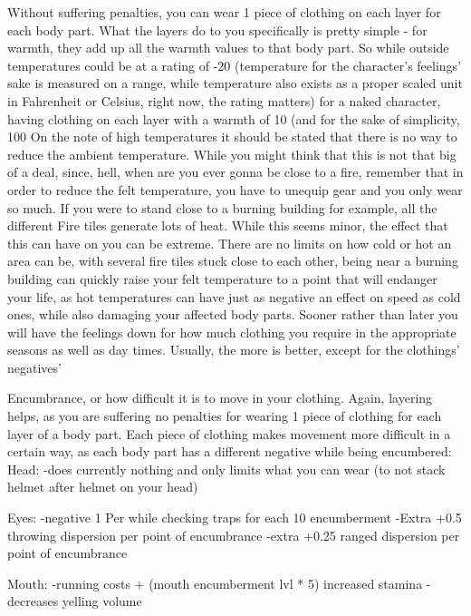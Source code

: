 \documentclass[11pt]{report}
\begin{document}
Without suffering penalties, you can wear 1 piece of clothing on each layer for each body part. What the layers do to you specifically is pretty simple - for warmth, they add up all the warmth values to that body part. So while outside temperatures could be at a rating of -20 (temperature for the character's feelings' sake is measured on a range, while temperature also exists as a proper scaled unit in Fahrenheit or Celsius, right now, the rating matters) for a naked character, having clothing on each layer with a warmth of 10 (and for the sake of simplicity, 100%
On the note of high temperatures it should be stated that there is no way to reduce the ambient temperature. While you might think that this is not that big of a deal, since, hell, when are you ever gonna be close to a fire, remember that in order to reduce the felt temperature, you have to unequip gear and you only wear so much. If you were to stand close to a burning building for example, all the different Fire tiles generate lots of heat. While this seems minor, the effect that this can have on you can be extreme. There are no limits on how cold or hot an area can be, with several fire tiles stuck close to each other, being near a burning building can quickly raise your felt temperature to a point that will endanger your life, as hot temperatures can have just as negative an effect on speed as cold ones, while also damaging your affected body parts. Sooner rather than later you will have the feelings down for how much clothing you require in the appropriate seasons as well as day times. Usually, the more is better, except for the clothings' negatives'

Encumbrance, or how difficult it is to move in your clothing. Again, layering helps, as you are suffering no penalties for wearing 1 piece of clothing for each layer of a body part. Each piece of clothing makes movement more difficult in a certain way, as each body part has a different negative while being encumbered:
Head:
-does currently nothing and only limits what you can wear (to not stack helmet after helmet on your head)

Eyes:
-negative 1 Per while checking traps for each 10 encumberment
-Extra +0.5 throwing dispersion per point of encumbrance
-extra +0.25 ranged dispersion per point of encumbrance

Mouth:
-running costs + (mouth encumberment lvl * 5) increased stamina
-decreases yelling volume
\end{document}
